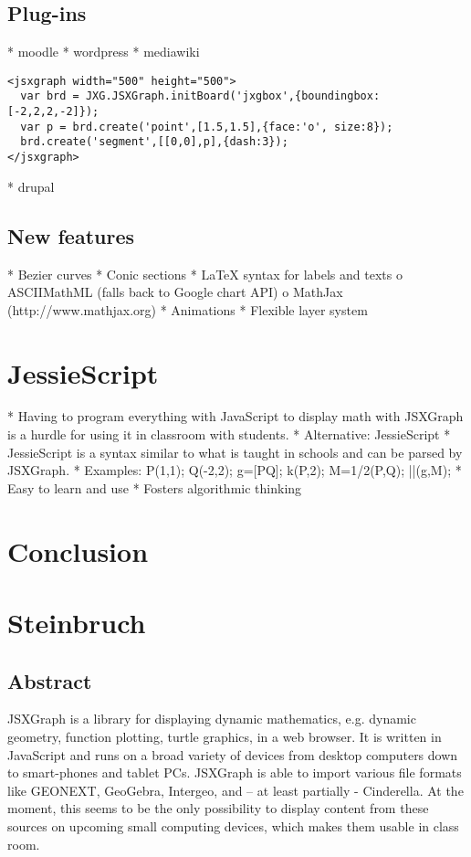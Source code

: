 \documentclass[12pt,a4paper]{article}%
\begin{document}
\subsection{Plug-ins}
    * moodle
    * wordpress
    * mediawiki
\begin{verbatim}
<jsxgraph width="500" height="500">
  var brd = JXG.JSXGraph.initBoard('jxgbox',{boundingbox:[-2,2,2,-2]});
  var p = brd.create('point',[1.5,1.5],{face:'o', size:8});
  brd.create('segment',[[0,0],p],{dash:3});
</jsxgraph>
\end{verbatim}                    
    * drupal 

\subsection{New features}
    * Bezier curves
    * Conic sections
    * \LaTeX{} syntax for labels and texts
          o ASCIIMathML (falls back to Google chart API)
          o MathJax (http://www.mathjax.org)
    * Animations
    * Flexible layer system 

\section{JessieScript}
    * Having to program everything with JavaScript to display math with JSXGraph is a hurdle for using it in classroom with students.
    * Alternative: JessieScript
    * JessieScript is a syntax similar to what is taught in schools and can be parsed by JSXGraph.
    * Examples: P(1,1); Q(-2,2); g=[PQ]; k(P,2); M=1/2(P,Q); ||(g,M);
    * Easy to learn and use
    * Fosters algorithmic thinking 




\section{Conclusion}


\section{Steinbruch}

\subsection{Abstract}
JSXGraph is a library for displaying dynamic mathematics, e.g. dynamic geometry, function plotting, turtle graphics, in a web browser. It is written in JavaScript and runs on a broad variety of devices from desktop computers down to smart-phones and tablet PCs. JSXGraph is able to import various file formats like GEONEXT, GeoGebra, Intergeo, and – at least partially - Cinderella. At the moment, this seems to be the only possibility to display content from these sources on upcoming small computing devices, which makes them usable in class room.
\end{document}

